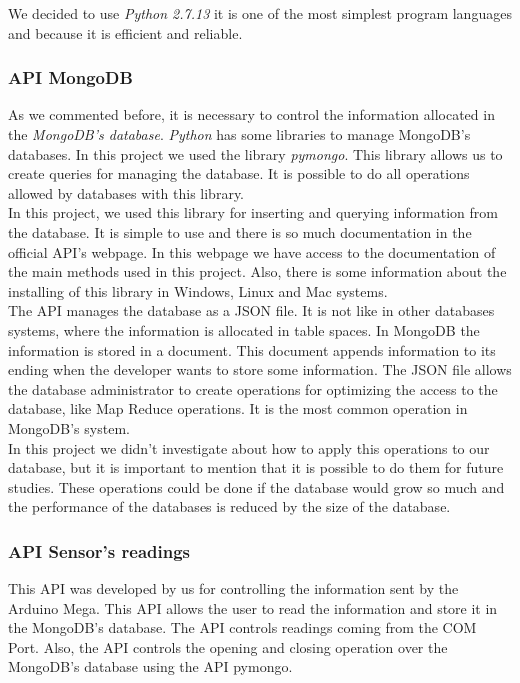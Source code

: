 We decided to use \textit{Python 2.7.13} it is one of the most simplest program languages and because it is efficient and reliable.

\subsubsection{API MongoDB}

As we commented before, it is necessary to control the information allocated in the \textit{MongoDB's database}. \textit{Python} has some libraries to manage MongoDB's databases. In this project we used the library \textit{pymongo}. This library allows us to create queries for managing the database. It is possible to do all operations allowed by databases with this library.\\

In this project, we used this library for inserting and querying information from the database. It is simple to use and there is so much documentation in the official API's webpage. In this webpage we have access to the documentation of the main methods used in this project. Also, there is some information about the installing of this library in Windows, Linux and Mac systems.\\

The API manages the database as a JSON file. It is not like in other databases systems, where the information is allocated in table spaces. In MongoDB the information is stored in a document. This document appends information to its ending when the developer wants to store some information. The JSON file allows the database administrator to create operations for optimizing the access to the database, like Map Reduce operations. It is the most common operation in MongoDB's system.\\

In this project we didn't investigate about how to apply this operations to our database, but it is important to mention that it is possible to do them for future studies. These operations could be done if the database would grow so much and the performance of the databases is reduced by the size of the database.

\subsubsection{API Sensor's readings}

This API was developed by us for controlling the information sent by the Arduino Mega. This API allows the user to read the information and store it in the MongoDB's database. The API controls readings coming from the COM Port. Also, the API controls the opening and closing operation over the MongoDB's database using the API pymongo.\\

